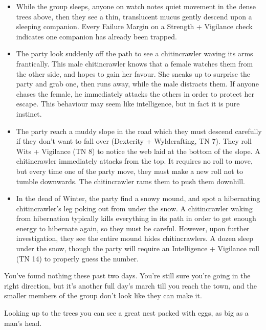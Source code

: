 \begin{multicols}{2}
\begin{itemize}
  \item
  While the group sleeps, anyone on watch notes quiet movement in the dense trees above, then they see a thin, translucent mucus gently descend upon a sleeping companion.
  Every Failure Margin on a Strength + Vigilance check indicates one companion has already been trapped.
  \item
  The party look suddenly off the path to see a chitincrawler waving its arms frantically.
  This male chitincrawler knows that a female watches them from the other side, and hopes to gain her favour.
  She sneaks up to surprise the party and grab one, then runs away, while the male distracts them.
  If anyone chases the female, he immediately attacks the others in order to protect her escape.
  This behaviour may seem like intelligence, but in fact it is pure instinct.
  \item
  The party reach a muddy slope in the road which they must descend carefully if they don't want to fall over (Dexterity + Wyldcrafting, TN 7).
  They roll Wits + Vigilance (TN 8) to notice the web laid at the bottom of the slope.
  A chitincrawler immediately attacks from the top.
  It requires no roll to move, but every time one of the party move, they must make a new roll not to tumble downwards.
  The chitincrawler rams them to push them downhill.
  \item
  In the dead of Winter, the party find a snowy mound, and spot a hibernating chitincrawler's leg poking out from under the snow.
  A chitincrawler waking from hibernation typically kills everything in its path in order to get enough energy to hibernate again, so they must be careful.
  However, upon further investigation, they see the entire mound hides chitincrawlers.
  A dozen sleep under the snow, though the party will require an Intelligence + Vigilance roll (TN 14) to properly guess the number.
  

\end{itemize}


\label{griffin}

\begin{boxtext}

  You've found nothing these past two days.  You're still sure you're going in the right direction, but it's another full day's march till you reach the town, and the smaller members of the group don't look like they can make it.

  Looking up to the trees you can see a great nest packed with eggs, as big as a man's head.


\end{boxtext}
\end{multicols}
